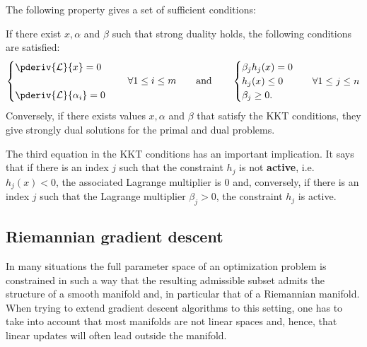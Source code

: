     The following property gives a set of sufficient conditions:
    \begin{property}
        If there exist $x,\alpha$ and $\beta$ such that strong duality holds, the following conditions are satisfied:
        \begin{align}
            \begin{cases}
                \pderiv{\mathcal{L}}{x} = 0\\\\
                \pderiv{\mathcal{L}}{\alpha_i} = 0
            \end{cases}
            \quad\forall1\leq i\leq m \qquad\text{and}\qquad
            \begin{cases}
                \beta_jh_j(x) = 0\\
                h_j(x)\leq0&\quad\forall1\leq j\leq n\\
                \beta_j\geq0.
            \end{cases}
        \end{align}
        Conversely, if there exists values $x,\alpha$ and $\beta$ that satisfy the KKT conditions, they give strongly dual solutions for the primal and dual problems.
    \end{property}
    \begin{remark}\label{data:slackness}
        The third equation in the KKT conditions has an important implication. It says that if there is an index $j$ such that the constraint $h_j$ is not \textbf{active}, i.e.~$h_j(x)<0$, the associated Lagrange multiplier is 0 and, conversely, if there is an index $j$ such that the Lagrange multiplier $\beta_j>0$, the constraint $h_j$ is active.
    \end{remark}


\subsection{Riemannian gradient descent}

    In many situations the full parameter space of an optimization problem is constrained in such a way that the resulting admissible subset admits the structure of a smooth manifold and, in particular that of a Riemannian manifold. When trying to extend gradient descent algorithms to this setting, one has to take into account that most manifolds are not linear spaces and, hence, that linear updates will often lead outside the manifold.

